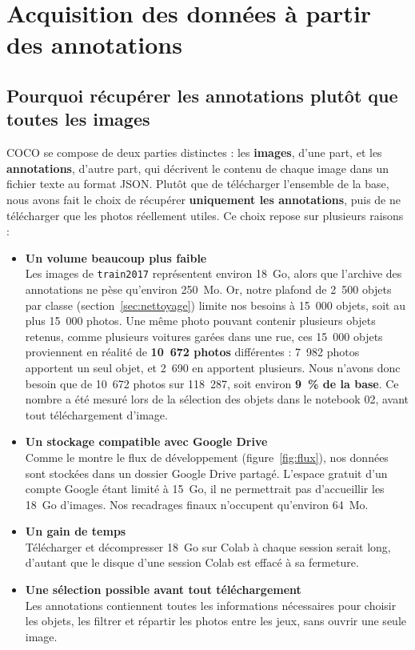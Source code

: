 \section{Acquisition des données à partir des annotations}
\label{sec:acquisition}

\subsection{Pourquoi récupérer les annotations plutôt que toutes les images}

COCO se compose de deux parties distinctes : les \textbf{images}, d'une part, et les \textbf{annotations}, d'autre part, qui décrivent le contenu de chaque image dans un fichier texte au format JSON. Plutôt que de télécharger l'ensemble de la base, nous avons fait le choix de récupérer \textbf{uniquement les annotations}, puis de ne télécharger que les photos réellement utiles. Ce choix repose sur plusieurs raisons :

\begin{itemize}
  \item \textbf{Un volume beaucoup plus faible}\\
  Les images de \texttt{train2017} représentent environ 18~Go, alors que l'archive des annotations ne pèse qu'environ 250~Mo. Or, notre plafond de 2~500 objets par classe (section~\ref{sec:nettoyage}) limite nos besoins à 15~000 objets, soit au plus 15~000 photos. Une même photo pouvant contenir plusieurs objets retenus, comme plusieurs voitures garées dans une rue, ces 15~000 objets proviennent en réalité de \textbf{10~672 photos} différentes : 7~982 photos apportent un seul objet, et 2~690 en apportent plusieurs. Nous n'avons donc besoin que de 10~672 photos sur 118~287, soit environ \textbf{9~\% de la base}. Ce nombre a été mesuré lors de la sélection des objets dans le notebook 02, avant tout téléchargement d'image.
  \item \textbf{Un stockage compatible avec Google Drive}\\
  Comme le montre le flux de développement (figure~\ref{fig:flux}), nos données sont stockées dans un dossier Google Drive partagé. L'espace gratuit d'un compte Google étant limité à 15~Go, il ne permettrait pas d'accueillir les 18~Go d'images. Nos recadrages finaux n'occupent qu'environ 64~Mo.
  \item \textbf{Un gain de temps}\\
  Télécharger et décompresser 18~Go sur Colab à chaque session serait long, d'autant que le disque d'une session Colab est effacé à sa fermeture.
  \item \textbf{Une sélection possible avant tout téléchargement}\\
  Les annotations contiennent toutes les informations nécessaires pour choisir les objets, les filtrer et répartir les photos entre les jeux, sans ouvrir une seule image.
\end{itemize}

